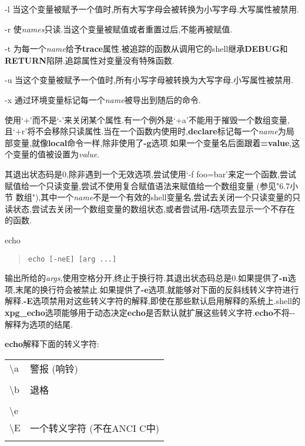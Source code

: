 \documentclass[draft,openany]{book}
\begin{document}
\begin{CJK}{UTF8}{gbsn}
\begin{basedescript}{\desclabelstyle{\nextlinelabel}\desclabelwidth{2.5em}}
\begin{basedescript}{\desclabelstyle{\nextlinelabel}\desclabelwidth{2.5em}}
        \item[-l] 当这个变量被赋予一个值时,所有大写字母会被转换为小写字母.大写属性被禁用.
        \item[-r] 使\emph{names}只读.当这个变量被赋值或者重置过后,不能再被赋值.
        \item[-t] 为每一个\emph{name}给予\textbf{trace}属性.被追踪的函数从调用它的shell继承\textbf{DEBUG}和\textbf{RETURN}陷阱.追踪属性对变量没有特殊函数.
        \item[-u] 当这个变量被赋予一个值时,所有小写字母被转换为大写字母.小写属性被禁用.
        \item[-x] 通过环境变量标记每一个\emph{name}被导出到随后的命令.
        \end{basedescript}
        使用`+'而不是`-'来关闭某个属性.有一个例外是`+a'不能用于摧毁一个数组变量,且`+r'将不会移除只读属性.当在一个函数内使用时,\textbf{declare}标记每一个\emph{name}为局部变量,就像\textbf{local}命令一样,除非使用了\textbf{-g}选项.如果一个变量名后面跟着\textbf{=value},这个变量的值被设置为\emph{value}.\par
        其退出状态码是0,除非遇到一个无效选项,尝试使用`-f foo=bar'来定一个函数,尝试赋值给一个只读变量,尝试不使用复合赋值语法来赋值给一个数组变量 (参见"6.7小节 数组"),其中一个\emph{name}不是一个有效的shell变量名,尝试去关闭一个只读变量的只读状态,尝试去关闭一个数组变量的数组状态,或者尝试用\textbf{-f}选项去显示一个不存在的函数.
    \item[echo]
        \begin{quote}
            \verb+echo [-neE] [arg ...]+
        \end{quote}
        输出所给的\emph{args},使用空格分开,终止于换行符.其退出状态码总是0.如果提供了\textbf{-n}选项,末尾的换行符会被禁止.如果提供了\textbf{-e}选项,就能够对下面的反斜线转义字符进行解释.\textbf{-E}选项禁用对这些转义字符的解释,即使在那些默认启用解释的系统上.shell的\textbf{xpg\_echo}选项能够用于动态决定\textbf{echo}是否默认就扩展这些转义字符.\textbf{echo}不将-{}-解释为选项的结尾.\par
        \textbf{echo}解释下面的转义字符:
        \begin{tabular}{lp{32em}}
            \textbackslash a & 警报 (响铃) \\ \\
            \textbackslash b & 退格 \\ \\
            \textbackslash e \\
            \textbackslash E & 一个转义字符 (不在ANCI C中) \\ \\

\end{tabular}
\end{basedescript}
\end{CJK}
\end{document}
